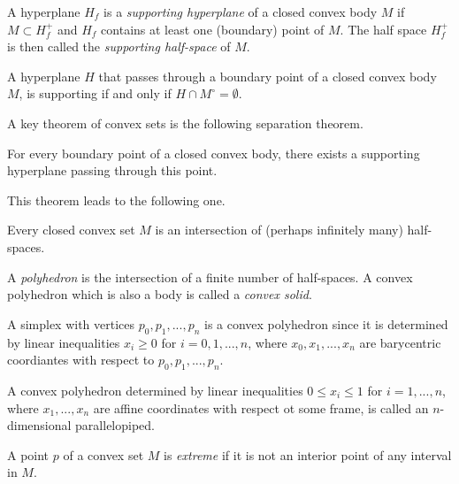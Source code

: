 \documentclass{article}
\begin{document}
    \begin{definition}
    A hyperplane $H_f$ is a \textit{supporting hyperplane} of a closed convex body $M$ if $M \subset H^+_f$ and $H_f$ contains at least one (boundary) point of $M$. The half space $H^+_f$ is then called the \textit{supporting half-space} of $M$. 
    \end{definition}

    \begin{proposition}
    A hyperplane $H$ that passes through a boundary point of a closed convex body $M$, is supporting if and only if $H \cap M^\circ = \emptyset$. 
    \end{proposition}

    A key theorem of convex sets is the following separation theorem. 

    \begin{theorem}
    For every boundary point of a closed convex body, there exists a supporting hyperplane passing through this point. 
    \end{theorem}

    This theorem leads to the following one. 

    \begin{theorem}
    Every closed convex set $M$ is an intersection of (perhaps infinitely many) half-spaces. 
    \end{theorem}

    \begin{definition}
    A \textit{polyhedron} is the intersection of a finite number of half-spaces. A convex polyhedron which is also a body is called a \textit{convex solid}. 
    \end{definition}

    \begin{example}
    A simplex with vertices $p_0, p_1, ..., p_n$ is a convex polyhedron since it is determined by linear inequalities $x_i \geq 0$ for $i = 0, 1, ..., n$, where $x_0, x_1, ..., x_n$ are barycentric coordiantes with respect to $p_0, p_1,..., p_n$. 
    \end{example}

    \begin{example}
    A convex polyhedron determined by linear inequalities $0 \leq x_i \leq 1$ for $i = 1, ..., n$, where $x_1,..., x_n$ are affine coordinates with respect ot some frame, is called an $n$-dimensional parallelopiped. 
    \end{example}

    \begin{definition}
    A point $p$ of a convex set $M$ is \textit{extreme} if it is not an interior point of any interval in $M$. 
    \end{definition}
\end{document}
